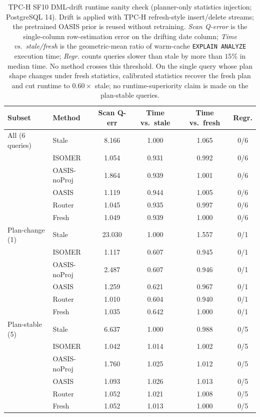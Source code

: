 \begin{table}[t]
\centering
\caption{TPC-H SF10 DML-drift runtime sanity check (planner-only statistics injection; PostgreSQL 14). Drift is applied with TPC-H refresh-style insert/delete streams; the pretrained OASIS prior is reused without retraining. \emph{Scan Q-error} is the single-column row-estimation error on the drifting date column; \emph{Time vs.\ stale/fresh} is the geometric-mean ratio of warm-cache \texttt{EXPLAIN ANALYZE} execution time; \emph{Regr.} counts queries slower than stale by more than $15\%$ in median time. No method crosses this threshold. On the single query whose plan shape changes under fresh statistics, calibrated statistics recover the fresh plan and cut runtime to $0.60\times$ stale; no runtime-superiority claim is made on the plan-stable queries.}
\label{tab:tpch_runtime}
\footnotesize
\setlength{\tabcolsep}{4pt}
\begin{tabular}{llcccc}
\toprule
Subset & Method & Scan Q-err & Time vs.\ stale & Time vs.\ fresh & Regr. \\
\midrule
All (6 queries) & Stale & 8.166 & 1.000 & 1.065 & 0/6 \\
 & ISOMER & 1.054 & 0.931 & 0.992 & 0/6 \\
 & OASIS-noProj & 1.864 & 0.939 & 1.001 & 0/6 \\
 & OASIS & 1.119 & 0.944 & 1.005 & 0/6 \\
 & Router & 1.045 & 0.935 & 0.997 & 0/6 \\
 & Fresh & 1.049 & 0.939 & 1.000 & 0/6 \\
\midrule
Plan-change (1) & Stale & 23.030 & 1.000 & 1.557 & 0/1 \\
 & ISOMER & 1.117 & 0.607 & 0.945 & 0/1 \\
 & OASIS-noProj & 2.487 & 0.607 & 0.946 & 0/1 \\
 & OASIS & 1.259 & 0.621 & 0.967 & 0/1 \\
 & Router & 1.010 & 0.604 & 0.940 & 0/1 \\
 & Fresh & 1.035 & 0.642 & 1.000 & 0/1 \\
\midrule
Plan-stable (5) & Stale & 6.637 & 1.000 & 0.988 & 0/5 \\
 & ISOMER & 1.042 & 1.014 & 1.002 & 0/5 \\
 & OASIS-noProj & 1.760 & 1.025 & 1.012 & 0/5 \\
 & OASIS & 1.093 & 1.026 & 1.013 & 0/5 \\
 & Router & 1.052 & 1.021 & 1.008 & 0/5 \\
 & Fresh & 1.052 & 1.013 & 1.000 & 0/5 \\
\bottomrule
\end{tabular}
\end{table}
